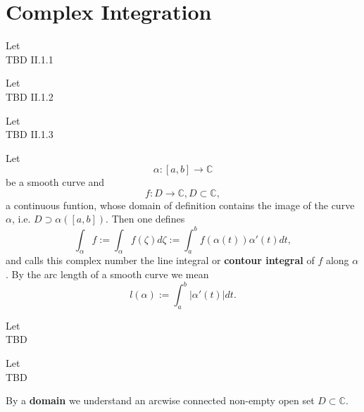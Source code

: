 \section{Complex Integration}


\begin{definition}[Curve]
    \label{sec:Curve}
    Let\\
    TBD II.1.1
\end{definition}


\begin{definition}
    \label{sec:SmoothCurve}
    Let\\
    TBD II.1.2
\end{definition}


\begin{definition}
    \label{sec:PiecewiseSmoothCurve}
    Let\\
    TBD II.1.3
\end{definition}


\begin{definition}
    \label{sec:ContourIntegral}
    Let
    $$\alpha : [a, b] \rightarrow \mathbb{C}$$
    be a smooth curve and
    $$f: D \rightarrow \mathbb{C}, D \subset \mathbb{C},$$
    a continuous funtion, whose domain of definition contains the image of the curve $\alpha$,
    i.e. $D \supset \alpha([a,b]).$ Then one defines
    $$ \int_\alpha f:= \int_\alpha f(\zeta) d\zeta := \int_a^b f(\alpha(t))\alpha'(t)dt,$$
    and calls this complex number the line integral or \textbf{contour integral} of $f$ along $\alpha$.
    By the arc length of a smooth curve we mean
    $$l(\alpha):=\int_a^b |\alpha'(t)|dt.$$
\end{definition}


\begin{definition}
    \label{sec:PropContourIntegral}
    Let\\
    TBD
\end{definition}


\begin{definition}
    \label{sec:ArcwiseConnected}
    Let\\
    TBD
\end{definition}


\begin{definition}[Domain (II.2.3)]
    \label{sec:Domain}
    By a \textbf{domain} we understand an arcwise connected non-empty open set $D \subset \mathbb{C}$.
\end{definition}


